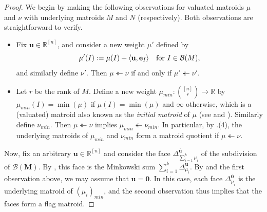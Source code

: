 \documentclass[11pt]{amsart}
\newcommand{\RR}{\mathbb R}
\newcommand{\bb}{\mathcal B}
\newcommand{\be}{\mathbf e}
\newcommand{\MM}{{\boldsymbol M}}
\newcommand{\bu}{{\mathbf u}}
\theoremstyle{definition}
\newcommand{\leon}[1]{{\color{teal} \sf Leon: [#1]}}
\newcommand{\chris}[1]{{\color{cyan} \sf Chris: [#1]}}
\begin{document}


\begin{proof}
We begin by making the following observations for valuated matroids $\mu$ and $\nu$ with underlying matroids $M$ and $N$ (respectively).  Both observations are straightforward to verify.
\begin{itemize}
\item Fix $\bu\in \RR^{[n]}$, and consider a new weight $\mu'$ defined by
\[
\mu'(I) := \mu(I) + \langle \bu, \be_I \rangle \quad \textnormal{for }I\in \bb(M),
\]
and similarly define $\nu'$.  Then $\mu\twoheadleftarrow \nu$ if and only if $\mu' \twoheadleftarrow \nu'$.
\item Let $r$ be the rank of $M$.  Define a new weight $\mu_{min}: \binom{[n]}{r} \to \RR$ by $\mu_{min}(I) = \min(\mu)$ if $\mu(I) = \min(\mu)$ and $\infty$ otherwise, which is a (valuated) matroid also known as the \emph{initial matroid} of $\mu$ (see \cite[Definition 4.2.7]{MS15} and \cite[Definition 2.1]{BS20}).
Similarly define $\nu_{min}$.  Then $\mu\twoheadleftarrow \nu$ implies $\mu_{min}\twoheadleftarrow \nu_{min}$.  In particular, by .(4), the underlying matroids of $\mu_{min}$ and $\nu_{min}$ form a matroid quotient if $\mu\twoheadleftarrow \nu$.
\end{itemize}
Now, fix an arbitrary $\bu\in \RR^{[n]}$ and consider the face $\Delta_{\sum_{i=1}^k \mu_i}^{\overline\bu}$ of the subdivision of $\bb(\MM)$.  By , this face is the Minkowski sum $\sum_{i=1}^k \Delta_{\mu_i}^{\overline\bu}$.  By  and the first observation above, we may assume that $\bu = \mathbf 0$.  In this case, each face $\Delta_{\mu_i}^{\mathbf 0}$ is the underlying matroid of $(\mu_i)_{min}$, and the second observation thus implies that the faces form a flag matroid.
\end{proof}
\end{document}
